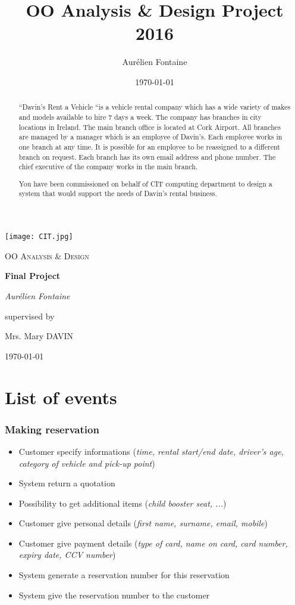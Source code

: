 \documentclass{report}
\author{Aurélien Fontaine}
\title{OO Analysis \& Design Project 2016}
\date{\today}
\begin{document}
\begin{titlepage}
    \centering
    \texttt{[image: CIT.jpg]}\par\vspace{1cm}
    {\scshape\Large OO Analysis \& Design\par}
    \vspace{1.5cm}
    {\huge\bfseries Final Project\par}
    \vspace{2cm}
    {\Large\itshape Aurélien Fontaine\par}
    \vfill
    supervised by\par
    Mrs. Mary \textsc{DAVIN}
    \vfill
    {\large \today\par}
\end{titlepage}
\begin{abstract}
    “Davin’s Rent a Vehicle “is a vehicle rental company which has a wide variety of makes and models available to hire 7 days a week. The company has branches in city locations in Ireland. The main branch office is located at Cork Airport. All branches are managed by a manager which is an employee of Davin’s. Each employee works in one branch at any time. It is possible for an employee to be reassigned to a different branch on request. Each branch has its own email address and phone number. The chief executive of the company works in the main branch.

    You have been commissioned on behalf of CIT computing department to design a system that would support the needs of Davin’s rental business.
\end{abstract}
\tableofcontents
\part{List of events}
\setcounter{chapter}{1}
\section{Making reservation}
    \begin{itemize}
        \item Customer specify informations (\textit{time, rental start/end date, driver's age, category of vehicle and pick-up point})
        \item System return a quotation
        \item Possibility to get additional items (\textit{child booster seat, ...})
        \item Customer give personal details (\textit{first name, surname, email, mobile})
        \item Customer give payment details (\textit{type of card, name on card, card number, expiry date, CCV number})
        \item System generate a reservation number for this reservation
        \item System give the reservation number to the customer
    \end{itemize}
\end{document}
